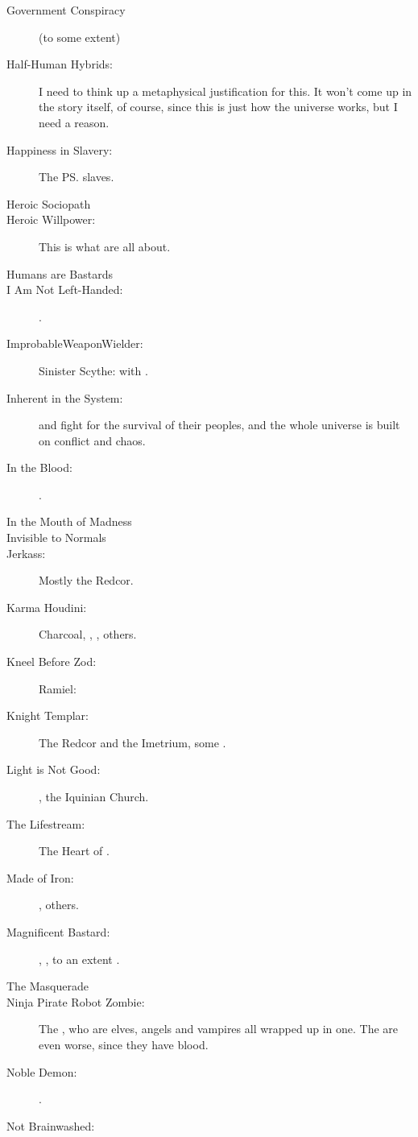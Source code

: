 \begin{flushleft}
\begin{description}
  \item[Government Conspiracy] (to some extent)
  \item[Half-Human Hybrids:] 
    I need to think up a metaphysical justification for this. It won't come up in the story itself, of course, since this is just how the \Miith{} universe works, but I need a reason.
  \item[Happiness in Slavery:] The \ps{\resphain} \human{} slaves.
  \item[Heroic Sociopath] 
  \item[Heroic Willpower:] This is what \vertices{} are all about. 
  \item[Humans are Bastards] 
  \item[I Am Not Left-Handed:] \Ishnaruchaefir. 
  \item[ImprobableWeaponWielder:]
    \subitem Sinister Scythe: \Ishnaruchaefir{} with \Triestessakhin. 
  \item[Inherent in the System:] 
    \Dragons{} and \banes{} fight for the survival of their peoples, and the whole universe is built on conflict and chaos.
  \item[In the Blood:] .
  \item[In the Mouth of Madness] 
  \item[Invisible to Normals]
  \item[Jerkass:] Mostly the Redcor. 
  \item[Karma Houdini:] Charcoal, \Nzessua, \HriistD, others. 
  \item[Kneel Before Zod:] 
    Ramiel: 
  \item[Knight Templar:] The Redcor and the Imetrium, some \resphain.
  \item[Light is Not Good:] \Teshrial, the Iquinian Church. 
  \item[The Lifestream:] The Heart of \Miith{}.
  \item[Made of Iron:] \Ishnaruchaefir, others. 
  \item[Magnificent Bastard:] \Daggerrain, \Secherdamon, to an extent \Ishnaruchaefir.
  \item[The Masquerade]
  \item[Ninja Pirate Robot Zombie:] 
    The \resphain, who are elves, angels and vampires all wrapped up in one. 
    The \satharioth{} are even worse, since they have \dragon{} blood.
  \item[Noble Demon:] \Ishnaruchaefir. 
  \item[Not Brainwashed:] 

\end{description}
\end{flushleft}
